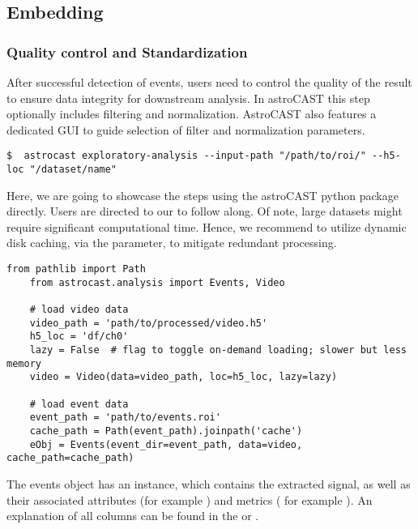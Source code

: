 \subsection{Embedding}\label{subsec:embedding}

\subsubsection{Quality control and Standardization}\label{subsubsec:quality-control}

After successful detection of events, users need to control the quality of the result to ensure data integrity for downstream analysis. In astroCAST this step optionally includes filtering and normalization. AstroCAST also features a dedicated GUI to guide selection of filter and normalization parameters.

\begin{lstlisting}[style=bashStyle]
    $  astrocast exploratory-analysis --input-path "/path/to/roi/" --h5-loc "/dataset/name"
\end{lstlisting}

Here, we are going to showcase the steps using the astroCAST python package directly. Users are directed to our  to follow along. Of note, large datasets might require significant computational time. Hence, we recommend to utilize dynamic disk caching, via the  parameter, to mitigate redundant processing.

\begin{lstlisting}[style=pyStyle]
    from pathlib import Path
    from astrocast.analysis import Events, Video

    # load video data
    video_path = 'path/to/processed/video.h5'
    h5_loc = 'df/ch0'
    lazy = False  # flag to toggle on-demand loading; slower but less memory
    video = Video(data=video_path, loc=h5_loc, lazy=lazy)

    # load event data
    event_path = 'path/to/events.roi'
    cache_path = Path(event_path).joinpath('cache')
    eObj = Events(event_dir=event_path, data=video, cache_path=cache_path)

\end{lstlisting}

The events object has an  instance, which contains the extracted signal, as well as their associated attributes (for example ) and metrics ( for example ). An explanation of all columns can be found in the  or .

